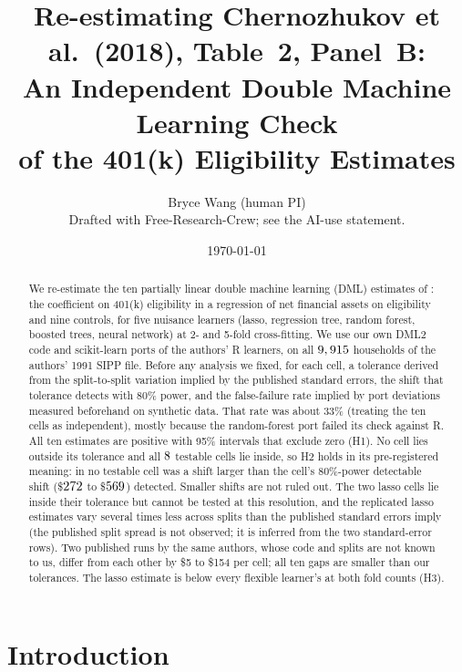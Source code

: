 \documentclass[11pt]{article}
\title{Re-estimating Chernozhukov et al.\ (2018), Table~2, Panel~B:\\
An Independent Double Machine Learning Check\\ of the 401(k) Eligibility Estimates}
\author{Bryce Wang (human PI) \\ \small Drafted with Free-Research-Crew; see the AI-use statement.}
\date{\today}
\begin{document}
\maketitle

\begin{abstract}
\noindent
We re-estimate the ten partially linear double machine learning (DML) estimates of
\citet[Table~2, Panel~B]{chernozhukov2018dml}: the coefficient on 401(k) eligibility in a
regression of net financial assets on eligibility and nine controls, for five nuisance
learners (lasso, regression tree, random forest, boosted trees, neural network) at 2- and
5-fold cross-fitting. We use our own DML2 code and scikit-learn ports of the authors' R
learners, on all $9,915$ households of the authors' 1991 SIPP file. Before any
analysis we fixed, for each cell, a tolerance derived from the split-to-split variation
implied by the published standard errors, the shift that tolerance detects with 80\%
power, and the false-failure rate implied by port deviations measured beforehand on
synthetic data. That rate was about 33\% (treating the ten cells as independent), mostly because the random-forest port failed
its check against R. All ten estimates are positive with 95\% intervals that exclude zero
(H1). No cell lies outside its tolerance and all $8$ testable cells lie
inside, so H2 holds in its pre-registered meaning: in no testable cell was a shift larger
than the cell's 80\%-power detectable shift (\$$272$ to \$$569$)
detected. Smaller shifts are not ruled out. The two lasso cells lie inside their
tolerance but cannot be tested at this resolution, and the replicated lasso estimates
vary several times less across splits than the published standard errors imply (the
published split spread is not observed; it is inferred from the two standard-error
rows). Two published runs by the same authors, whose code and splits are not known to
us, differ from each other by \$5 to \$154 per cell; all ten gaps are smaller than our
tolerances. The lasso estimate is
below every flexible learner's at both fold counts (H3).
\end{abstract}

\section{Introduction}
\label{sec:intro}
\end{document}
